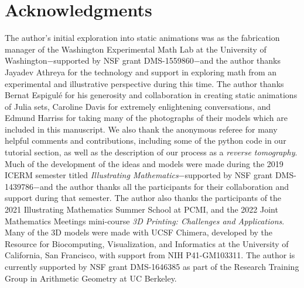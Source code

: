 \documentclass[12 pt]{article}
\begin{document}
\section*{Acknowledgments}
The author's initial exploration into static animations was as the fabrication manager of the Washington Experimental Math Lab at the University of Washington$-$supported by NSF grant DMS-1559860$-$and the author thanks Jayadev Athreya for the technology and support in exploring math from an experimental and illustrative perspective during this time.  The author thanks Bernat Espigul\'e for his generosity and collaboration in creating static animations of Julia sets, Caroline Davis for extremely enlightening conversations, and Edmund Harriss for taking many of the photographs of their models which are included in this manuscript.  We also thank the anonymous referee for many helpful comments and contributions, including some of the python code in our tutorial section, as well as the description of our process as a \textit{reverse tomography}.  Much of the development of the ideas and models were made during the 2019 ICERM semester titled \textit{Illustrating Mathematics}$-$supported by NSF grant DMS-1439786$-$and the author thanks all the participants for their collaboration and support during that semester.  The author also thanks the participants of the 2021 Illustrating Mathematics Summer School at PCMI, and the 2022 Joint Mathematics Meetings mini-course \textit{3D Printing: Challenges and Applications}.  Many of the 3D models were made with UCSF Chimera, developed by the Resource for Biocomputing, Visualization, and Informatics at the University of California, San Francisco, with support from NIH P41-GM103311.  The author is currently supported by NSF grant DMS-1646385 as part of the Research Training Group in Arithmetic Geometry at UC Berkeley.
\end{document}
